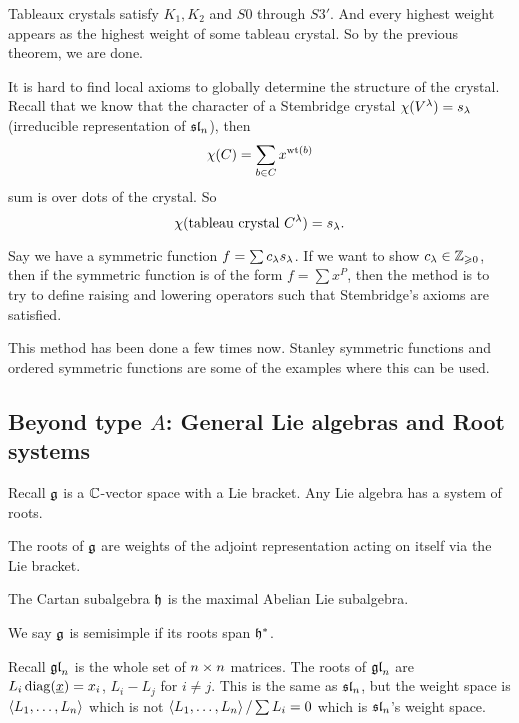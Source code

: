 \documentclass[12pt]{memoir}
\begin{document}
\begin{ptcbp}
    Tableaux crystals satisfy $K_1,K_2$ and $S0$ through $S3'$. And every highest weight appears as the highest weight of some tableau crystal. So by the previous theorem, we are done.
\end{ptcbp}

\begin{Rmk}
    It is hard to find local axioms to globally determine the structure of the crystal. Recall that we know that the character of a Stembridge crystal $\chi(V^\lambda)=s_\lambda$ (irreducible representation of $\mathfrak{sl}_n$), then 
    $$\chi(C)=\sum_{b\in C} x^{\mathrm{wt}(b)}$$
    sum is over dots of the crystal. So 
    $$\chi(\text{tableau crystal }C^\lambda)=s_\lambda.$$
\end{Rmk}

\begin{Cor}
    Say we have a symmetric function $f=\sum c_\lambda s_\lambda$. If we want to show $c_\lambda\in\mathbb{Z}_{\geqslant 0}$, then if the symmetric function is of the form $f=\sum x^P$, then the method is to try to define raising and lowering operators such that Stembridge's axioms are satisfied. 
\end{Cor}

This method has been done a few times now. Stanley symmetric functions and ordered symmetric functions are some of the examples where this can be used.

\subsection{Beyond type $A$: General Lie algebras and Root systems}

Recall $\mathfrak{g}$ is a $\mathbb{C}$-vector space with a Lie bracket. Any Lie algebra has a system of roots. 

\begin{Def}
The roots of $\mathfrak{g}$ are weights of the adjoint representation acting on itself via the Lie bracket.\par
The Cartan subalgebra $\mathfrak{h}$ is the maximal Abelian Lie subalgebra.
\end{Def}

\begin{Def}
We say $\mathfrak{g}$ is semisimple if its roots span $\mathfrak{h}^\ast$.
\end{Def}

\begin{Ex}
    Recall $\mathfrak{gl}_n$ is the whole set of $n\times n$ matrices. The roots of $\mathfrak{gl}_n$ are $L_i\operatorname{diag}(\underline x)=x_i$, $L_i-L_j$ for $i\neq j$. This is the same as $\mathfrak{sl}_n$, but the weight space is $\left\langle L_1,\dots,L_n\right\rangle$ which is not $\left\langle L_1,\dots,L_n\right\rangle/\sum L_i=0$ which is $\mathfrak{sl}_n$'s weight space.
\end{Ex}
\end{document}
